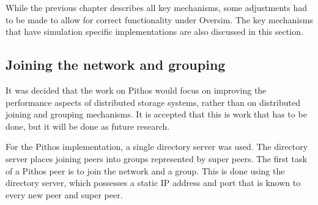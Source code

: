 
While the previous chapter describes all key mechanisms, some adjustments had to be made to allow for correct functionality under Oversim. The key mechanisms that have simulation specific implementations are also discussed in this section.

\subsection{Joining the network and grouping}
\label{joining_and_grouping_imp}

It was decided that the work on Pithos would focus on improving the performance aspects of distributed storage systems, rather than on distributed joining and grouping mechanisms. It is accepted that this is work that has to be done, but it will be done as future research.

For the Pithos implementation, a single directory server was used. The directory server places joining peers into groups represented by super peers. The first task of a Pithos peer is to join the network and a group. This is done using the directory server, which possesses a static IP address and port that is known to every new peer and super peer.

